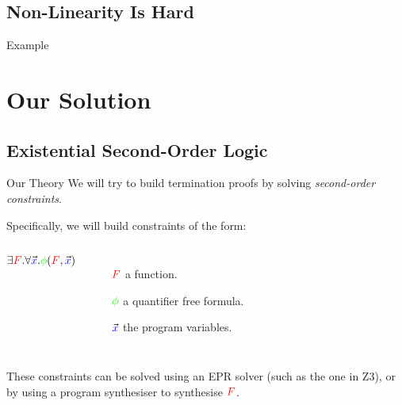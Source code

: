 \documentclass[xcolor=pdftex,t,11pt]{beamer}
\begin{document}
\subsection{Non-Linearity Is Hard}



\begin{frame}{Example}
\end{frame}

\section{Our Solution}

\subsection{Existential Second-Order Logic}

\begin{frame}[fragile]{Our Theory}
 We will try to build termination proofs by solving \emph{second-order constraints}.

 \vspace{1em}

 Specifically, we will build constraints of the form:

 \begin{center}
 \begin{columns}
  $\exists {\textcolor{red} F} . \forall \vec{\textcolor{blue} x} . {\textcolor{green} \phi}({\textcolor{red} F}, \vec{\textcolor{blue} x})$

  \begin{minipage}{\textwidth}
 \begin{itemize}
  \item[$\textcolor{red} F$] a function.
  \item[$\textcolor{green} \phi$] a quantifier free formula.
  \item[$\vec{\textcolor{blue} x}$] the program variables.
 \end{itemize}
 \end{minipage}
 \end{columns}

 \end{center}

 \vspace{.75em}

 These constraints can be solved using an EPR solver (such as the one in Z3), or by using a program
 synthesiser to synthesise $\textcolor{red} F$.
\end{frame}
\end{document}
